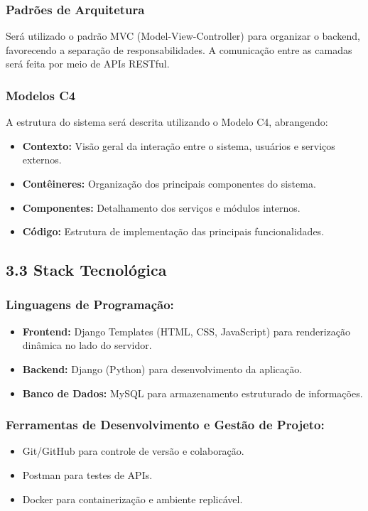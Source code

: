 \documentclass[12pt]{article}
\begin{document}
\subsubsection*{Padrões de Arquitetura}
Será utilizado o padrão MVC (Model-View-Controller) para organizar o backend, favorecendo a separação de responsabilidades. A comunicação entre as camadas será feita por meio de APIs RESTful.

\subsubsection*{Modelos C4}
A estrutura do sistema será descrita utilizando o Modelo C4, abrangendo:
\begin{itemize}
\item \textbf{Contexto:} Visão geral da interação entre o sistema, usuários e serviços externos.
\item \textbf{Contêineres:} Organização dos principais componentes do sistema.
\item \textbf{Componentes:} Detalhamento dos serviços e módulos internos.
\item \textbf{Código:} Estrutura de implementação das principais funcionalidades.
\end{itemize}

\subsection*{3.3 Stack Tecnológica}

\subsubsection*{Linguagens de Programação:}
\begin{itemize}
\item \textbf{Frontend:} Django Templates (HTML, CSS, JavaScript) para renderização dinâmica no lado do servidor.
\item \textbf{Backend:} Django (Python) para desenvolvimento da aplicação.
\item \textbf{Banco de Dados:} MySQL para armazenamento estruturado de informações.
\end{itemize}

\subsubsection*{Ferramentas de Desenvolvimento e Gestão de Projeto:}
\begin{itemize}
\item Git/GitHub para controle de versão e colaboração.
\item Postman para testes de APIs.
\item Docker para containerização e ambiente replicável.
\end{itemize}
\end{document}
